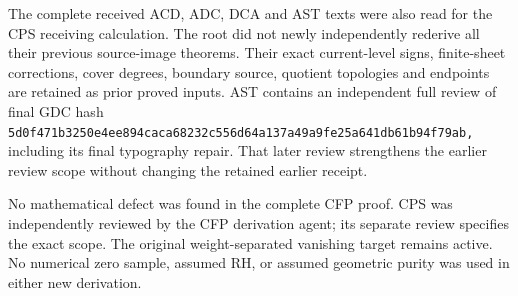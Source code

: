 The complete received ACD, ADC, DCA and AST texts were also read for the
CPS receiving calculation. The root did not newly independently rederive
all their previous source-image theorems. Their exact current-level
signs, finite-sheet corrections, cover degrees, boundary source,
quotient topologies and endpoints are retained as prior proved inputs.
AST contains an independent full review of final GDC hash
\nolinkurl{5d0f471b3250e4ee894caca68232c556d64a137a49a9fe25a641db61b94f79ab,}
including its final typography repair. That later review strengthens the
earlier review scope without changing the retained earlier receipt.

No mathematical defect was found in the complete CFP proof. CPS was
independently reviewed by the CFP derivation agent; its separate review
specifies the exact scope. The original weight-separated vanishing
target remains active. No numerical zero sample, assumed RH, or assumed
geometric purity was used in either new derivation.
